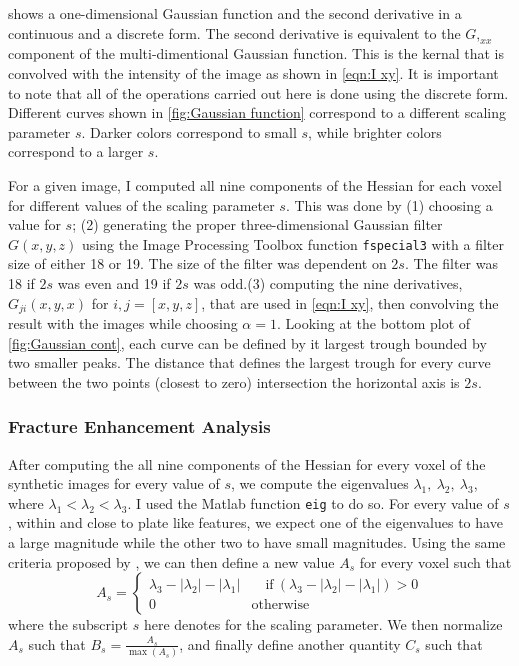 \documentclass{edger}
\begin{document}
 shows a one-dimensional Gaussian function and the second derivative in a continuous and a discrete form. The second derivative is equivalent to the $G,_{xx}$ component of the multi-dimentional Gaussian function. This is the kernal that is convolved with the intensity of the image as shown in \autoref{eqn:I xy}. It is important to note that all of the operations carried out here is done using the discrete form. Different curves shown in \autoref{fig:Gaussian function} correspond to a different scaling parameter $s$. Darker colors correspond to small $s$, while brighter colors correspond to a larger $s$. 

For a given image, I computed all nine components of the Hessian for each voxel for different values of the scaling parameter $s$. This was done by (1) choosing a value for $s$; (2) generating the proper three-dimensional Gaussian filter $G(x,y,z)$ using the   Image Processing Toolbox function \texttt{fspecial3} with a filter size of either 18 or 19. The size of the filter was dependent on $2s$. The filter was 18 if $2s$ was even and 19 if $2s$ was odd.(3) computing the nine derivatives, $G_{ji}(x,y,x)$ for $i,j = [x,y,z]$, that are used in \autoref{eqn:I xy}, then convolving the result with the images while choosing $\alpha = 1$. Looking at the bottom plot of \autoref{fig:Gaussian cont}, each curve can be defined by it largest trough bounded by two smaller peaks. The distance that defines the largest trough for every curve between the two points (closest to zero) intersection the horizontal axis is $2s$. 

\subsubsection{Fracture Enhancement Analysis} \label{sec:Fracture Enhancement Analysis}
After computing the all nine components of the Hessian for every voxel of the synthetic images for every value of $s$, we compute the eigenvalues $\lambda_1,~ \lambda_2,~\lambda_3$, where $\lambda_1 < \lambda_2 < \lambda_3$. I used the Matlab function \texttt{eig} to do so. For every value of $s$, within and close to plate like features, we expect one of the eigenvalues to have a large magnitude while the other two to have small magnitudes. Using the same criteria proposed by \cite{Voorn2013}, we can then define a new value $A_s$ for every voxel such that 
$$A_s = \begin{cases}
\lambda_3 - |\lambda_2| - |\lambda_1| &\quad \text{if} ~ (\lambda_3 - |\lambda_2| - |\lambda_1|) > 0\\
0 \qquad &\text{otherwise}
\end{cases} $$
where the subscript $s$ here denotes for the scaling parameter. We then normalize $A_s$ such that $B_s = \frac{A_s}{\max(A_s)}$, and finally define another quantity $C_s$ such that 
\end{document}
